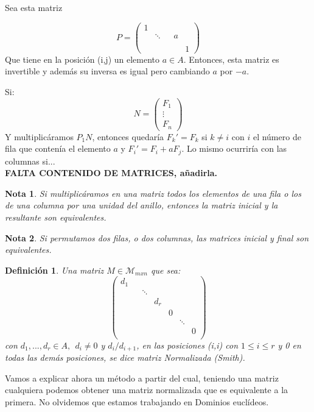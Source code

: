 \documentclass[11pt, a4paper, titlepage]{article}
\newif\IfInSansMode
\theoremstyle{theorem-style}
\theoremstyle{definition-style}
\newtheorem{ndef}{Definición}[section]
\theoremstyle{remark-style}
\newtheorem*{nota}{Nota}
\theoremstyle{example-style}
\begin{document}
Sea esta matriz

	\[P= \left( \begin{array}{ccccc}
 1&  &  & & \\
 &   \ddots & & a \\
 &  &  &  &  \\
 & & & & 1
 \end{array} \right)\]
Que tiene en la posición (i,j) un elemento $a\in A$. Entonces, esta matriz es invertible y además su inversa es igual pero cambiando $a$ por $-a$.

Si:
	\[ N =  \left( \begin{array}{c}
 F_1 \\
 \vdots\\
 F_n
 \end{array} \right)   \]
 Y multiplicáramos $P_1N$, entonces quedaría $F_k' = F_k $ si $k \ne i$ con $i$ el número de fila que contenía el elemento $a$ y $F_i'=F_i+aF_j$. Lo mismo ocurriría con las columnas si...\\
\textbf{FALTA CONTENIDO DE MATRICES, añadirla.}



\begin{nota}
	Si multiplicáramos en una matriz todos los elementos de una fila o los de una columna por una unidad del anillo, entonces la matriz inicial y la resultante son equivalentes.
\end{nota}
\begin{nota}
	Si permutamos dos filas, o dos columnas, las matrices inicial y final son equivalentes.
\end{nota}

\begin{ndef}
	Una matriz $M \in \mathcal{M}_{mxn}$ que sea:
		\[ \begin{pmatrix}
 d_{1}&  &  & & \\
 &  & \ddots &  &  \\
 & & &d_{r} &\\
 & & & & 0 \\
 & & & & & \ddots& \\
 & & & &  & & 0 \\
\end{pmatrix} \]
 con $d_1,...,d_r \in A, \ \ d_i \ne 0$ y $d_i / d_{i+1}$, en las posiciones (i,i) con $1 \leq i \leq r$ y 0 en todas las demás posiciones, se dice matriz Normalizada (Smith).
\end{ndef}

Vamos a explicar ahora un método a partir del cual, teniendo una matriz cualquiera podemos obtener una matriz normalizada que es equivalente a la primera. No olvidemos que estamos trabajando en Dominios euclídeos.
\end{document}
